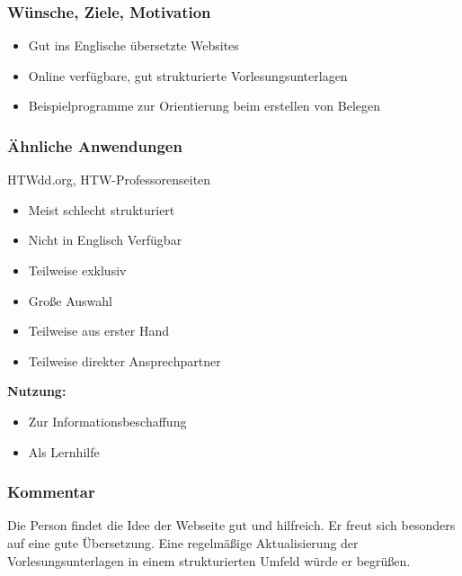 \begin{minipage}[t][][b]{.45\textwidth}
\subsubsection*{Wünsche, Ziele, Motivation}%
\begin{itemize}[leftmargin=*]
\item Gut ins Englische übersetzte Websites
\item Online verfügbare, gut strukturierte Vorlesungsunterlagen
\item Beispielprogramme zur Orientierung beim erstellen von Belegen
\end{itemize}
\end{minipage}\hfill
%
\begin{minipage}[t][][b]{.45\textwidth}
\subsubsection*{Ähnliche Anwendungen}
HTWdd.org, HTW-Professorenseiten
\begin{itemize}[leftmargin=*,label={$-$}]
\item Meist schlecht strukturiert
\item Nicht in Englisch Verfügbar
\item Teilweise exklusiv
\end{itemize}
\begin{itemize}[leftmargin=*,label={$+$}]
\item Große Auswahl
\item Teilweise aus erster Hand
\item Teilweise direkter Ansprechpartner
\end{itemize}
\textbf{Nutzung:}
\begin{itemize}[leftmargin=*]
\item Zur Informationsbeschaffung
\item Als Lernhilfe
\end{itemize}
\end{minipage}\bigskip

\subsubsection*{Kommentar}
Die Person findet die Idee der Webseite gut und hilfreich. Er freut sich besonders auf eine gute Übersetzung. Eine regelmäßige Aktualisierung der Vorlesungsunterlagen in einem strukturierten Umfeld würde er begrüßen.

